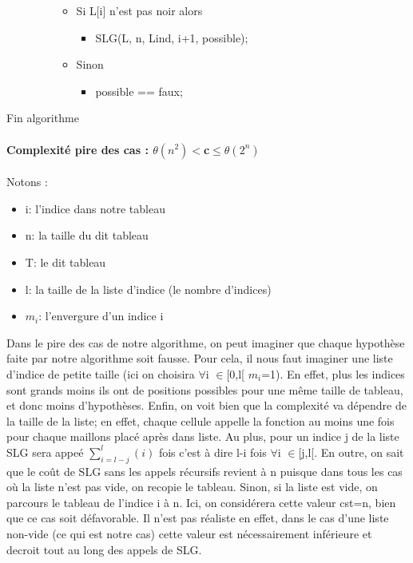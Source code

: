 \documentclass{article}
\begin{document}
\begin{description}
\begin{itemize}
\begin{itemize}
    \item Si L[i] n'est pas noir alors
      \begin{itemize}
      \item SLG(L, n, Lind, i+1, possible);
      \end{itemize}
    \item Sinon 
      \begin{itemize}
      \item possible == faux;
      \end{itemize}
    \end{itemize}
  \end{itemize}
\item[Fin algorithme]
\end{description}
\paragraph{Complexité pire des cas : $\theta(n^2) <$c$\leq\theta(2^n)$\\ }
 Notons :
\begin{itemize}
\item i: l'indice dans notre tableau
\item n: la taille du dit tableau
\item T: le dit tableau
\item l: la taille de la liste d'indice (le nombre d'indices)
\item $m_i$: l'envergure d'un indice i
\end{itemize}
Dans le pire des cas de notre algorithme, on peut imaginer que chaque hypothèse faite par notre algorithme soit fausse. Pour cela, il nous faut imaginer une liste d'indice de petite taille (ici on choisira $\forall$i $\in$[0,l[ $m_i$=1). En effet, plus les indices sont grands moins ils ont de positions possibles pour une même taille de tableau, et donc moins d'hypothèses.
\newline Enfin, on voit bien que la complexité va dépendre de la taille de la liste; en effet, chaque cellule appelle la fonction au moins une fois pour chaque maillons placé après dans liste. Au plus, pour un indice j de la liste SLG sera appeé $\sum_{i=l-j}^{l} (i)$ fois c'est à dire l-i fois $\forall$i $\in$[j,l[.
\newline En outre, on sait que le coût de SLG sans les appels récursifs revient à n puisque dans tous les cas où la liste n'est pas vide, on recopie le tableau. Sinon, si la liste est vide, on parcours le tableau de l'indice i à n. Ici, on considérera cette valeur cst=n, bien que ce cas soit défavorable. Il n'est pas réaliste en effet, dans le cas d'une liste non-vide (ce qui est notre cas) cette valeur est nécessairement inférieure et decroit tout au long des appels de SLG.
\end{document}
